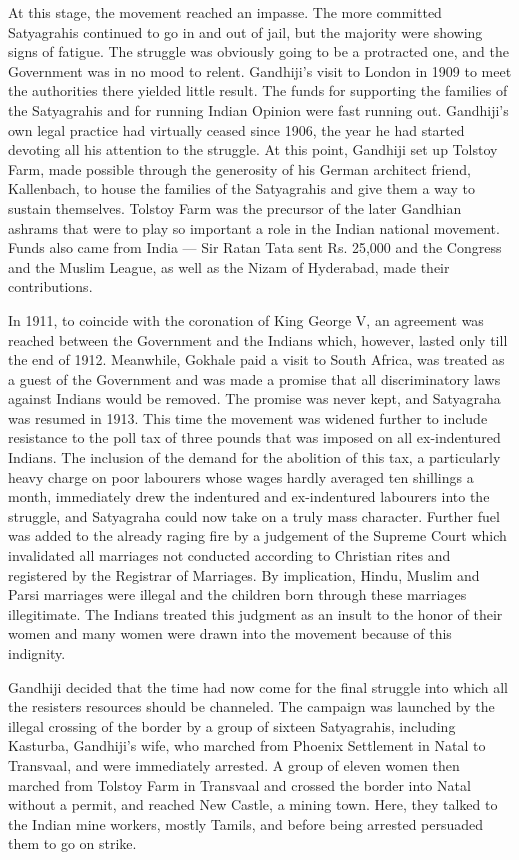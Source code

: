 \begin{multicols}{2}
At this stage, the movement reached an impasse. The more committed Satyagrahis continued to go in and out of jail, but the majority were showing signs of fatigue. The struggle was obviously going to be a protracted one, and the Government was in no mood to relent. Gandhiji's visit to London in 1909 to meet the authorities there yielded little result. The funds for supporting the families of the Satyagrahis and for running Indian Opinion were fast running out. Gandhiji's own legal practice had virtually ceased since 1906, the year he had started devoting all his attention to the struggle. At this point, Gandhiji set up Tolstoy Farm, made possible through the generosity of his German architect friend, Kallenbach, to house the families of the Satyagrahis and give them a way to sustain themselves. Tolstoy Farm was the precursor of the later Gandhian ashrams that were to play so important a role in the Indian national movement. Funds also came from India --- Sir Ratan Tata sent Rs. 25,000 and the Congress and the Muslim League, as well as the Nizam of Hyderabad, made their contributions.

In 1911, to coincide with the coronation of King George V, an agreement was reached between the Government and the Indians which, however, lasted only till the end of 1912. Meanwhile, Gokhale paid a visit to South Africa, was treated as a guest of the Government and was made a promise that all discriminatory laws against Indians would be removed. The promise was never kept, and Satyagraha was resumed in 1913. This time the movement was widened further to include resistance to the poll tax of three pounds that was imposed on all ex-indentured Indians. The inclusion of the demand for the abolition of this tax, a particularly heavy charge on poor labourers whose wages hardly averaged ten shillings a month, immediately drew the indentured and ex-indentured labourers into the struggle, and Satyagraha could now take on a truly mass character. Further fuel was added to the already raging fire by a judgement of the Supreme Court which invalidated all marriages not conducted according to Christian rites and registered by the Registrar of Marriages. By implication, Hindu, Muslim and Parsi marriages were illegal and the children born through these marriages illegitimate. The Indians treated this judgment as an insult to the honor of their women and many women were drawn into the movement because of this indignity.

Gandhiji decided that the time had now come for the final struggle into which all the resisters resources should be channeled. The campaign was launched by the illegal crossing of the border by a group of sixteen Satyagrahis, including Kasturba, Gandhiji's wife, who marched from Phoenix Settlement in Natal to Transvaal, and were immediately arrested. A group of eleven women then marched from Tolstoy Farm in Transvaal and crossed the border into Natal without a permit, and reached New Castle, a mining town. Here, they talked to the Indian mine workers, mostly Tamils, and before being arrested persuaded them to go on strike.


\end{multicols}
